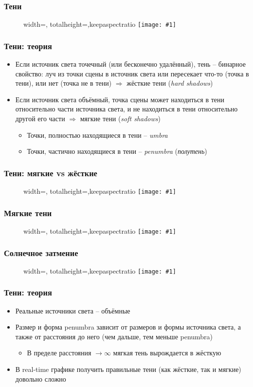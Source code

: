 \documentclass[10pt]{beamer}
\newcommand{\slideimage}[1]{
  \begin{figure}
    \begin{adjustbox}{width=\textwidth, totalheight=\textheight-2\baselineskip-2\baselineskip,keepaspectratio}
      \texttt{[image: \#1]}
    \end{adjustbox}
  \end{figure}
}
\begin{document}
\begin{frame}[fragile]
\frametitle{Тени}
\slideimage{shadows1.png}
\end{frame}

\begin{frame}[fragile]
\frametitle{Тени: теория}
\begin{itemize}
\item Если источник света точечный (или бесконечно удалённый), тень -- бинарное свойство: луч из точки сцены в источник света или пересекает что-то (точка в тени), или нет (точка не в тени) \begin{math}\Longrightarrow\end{math} жёсткие тени (\textit{hard shadows})
\pause
\item Если источник света объёмный, точка сцены может находиться в тени относительно части источника света, и не находиться в тени относительно другой его части \begin{math}\Longrightarrow\end{math} мягкие тени (\textit{soft shadows})
\pause
\begin{itemize}
\item Точки, полностью находящиеся в тени -- \textit{umbra}
\item Точки, частично находящиеся в тени -- \textit{penumbra} (\textit{полутень})
\end{itemize}
\end{itemize}
\end{frame}

\begin{frame}[fragile]
\frametitle{Тени: мягкие vs жёсткие}
\slideimage{shadow-scheme1.png}
\end{frame}

\begin{frame}[fragile]
\frametitle{Мягкие тени}
\slideimage{shadows2.png}
\end{frame}

\begin{frame}[fragile]
\frametitle{Солнечное затмение}
\slideimage{eclipse.png}
\end{frame}

\begin{frame}[fragile]
\frametitle{Тени: теория}
\begin{itemize}
\item Реальные источники света -- объёмные
\pause
\item Размер и форма penumbra зависит от размеров и формы источника света, а также от расстояния до него (чем дальше, тем меньше penumbra)
\pause
\begin{itemize}
\item В пределе расстояния \begin{math}\rightarrow\infty\end{math} мягкая тень вырождается в жёсткую
\end{itemize}
\pause
\item В real-time графике получить правильные тени (как жёсткие, так и мягкие) довольно сложно
\end{itemize}
\end{frame}
\end{document}
